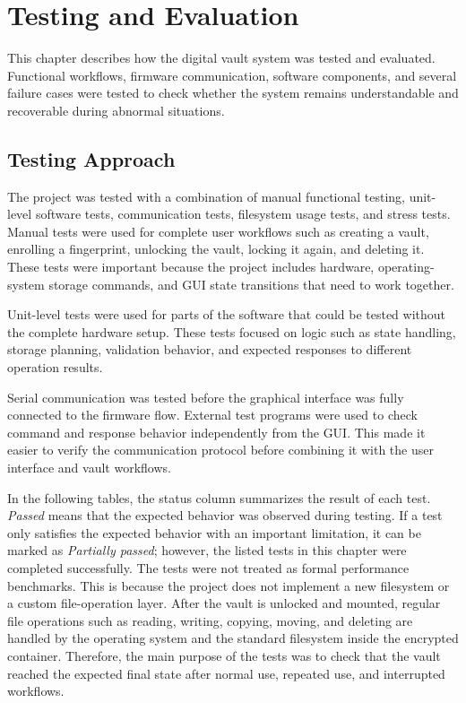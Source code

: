\chapter{Testing and Evaluation}

This chapter describes how the digital vault system was tested and evaluated. Functional workflows, firmware communication, software components, and several failure cases were tested to check whether the system remains understandable and recoverable during abnormal situations.

\section{Testing Approach}

The project was tested with a combination of manual functional testing, unit-level software tests, communication tests, filesystem usage tests, and stress tests. Manual tests were used for complete user workflows such as creating a vault, enrolling a fingerprint, unlocking the vault, locking it again, and deleting it. These tests were important because the project includes hardware, operating-system storage commands, and GUI state transitions that need to work together.

Unit-level tests were used for parts of the software that could be tested without the complete hardware setup. These tests focused on logic such as state handling, storage planning, validation behavior, and expected responses to different operation results.

Serial communication was tested before the graphical interface was fully connected to the firmware flow. External test programs were used to check command and response behavior independently from the GUI. This made it easier to verify the communication protocol before combining it with the user interface and vault workflows.

In the following tables, the status column summarizes the result of each test. \textit{Passed} means that the expected behavior was observed during testing. If a test only satisfies the expected behavior with an important limitation, it can be marked as \textit{Partially passed}; however, the listed tests in this chapter were completed successfully. The tests were not treated as formal performance benchmarks. This is because the project does not implement a new filesystem or a custom file-operation layer. After the vault is unlocked and mounted, regular file operations such as reading, writing, copying, moving, and deleting are handled by the operating system and the standard filesystem inside the encrypted container. Therefore, the main purpose of the tests was to check that the vault reached the expected final state after normal use, repeated use, and interrupted workflows.

